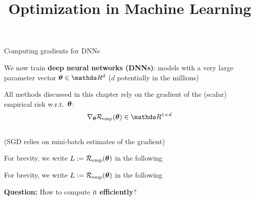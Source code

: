 \documentclass[11pt,compress,t,notes=noshow, xcolor=table]{beamer}
\title{Optimization in Machine Learning}
\begin{document}





\begin{framei}{Computing gradients for DNNs}
\item We now train \textbf{deep neural networks (DNNs)}: models with a very large parameter vector $\thetav \in \R^{d}$ ($d$ potentially in the millions)
\item All methods discussed in this chapter rely on the gradient of the (scalar) empirical risk w.r.t.\ $\bm{\theta}$:
$$
\nabla_{\thetav} \risket \in \R^{1 \times d}
$$
\\ {\footnotesize(SGD relies on mini-batch estimates of the gradient)}

\item For brevity, we write $L := \mathcal{R}_{\text{emp}}(\bm{\theta})$ in the following
\item For brevity, we write $L := \mathcal{R}_{\text{emp}}(\bm{\theta})$ in the following
\spacer
\item \textbf{Question:} How to compute it \textbf{efficiently}?
\end{framei}
\end{document}
